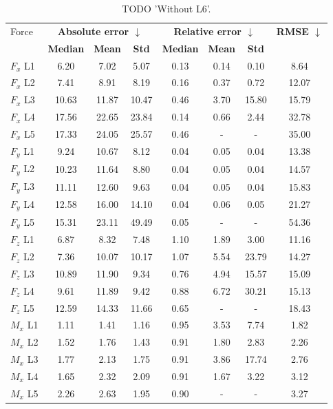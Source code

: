 \begin{table}[h]
\centering
\caption{TODO 'Without L6'.}
\label{tab:prelim:without_l6.tex}
\begin{tabular}{lccccccc}
\toprule
Force & \multicolumn{3}{c}{\bfseries Absolute error $\downarrow$} & \multicolumn{3}{c}{\bfseries Relative error $\downarrow$} & \bfseries RMSE $\downarrow$ \\
  & \bfseries Median & \bfseries Mean & \bfseries Std & \bfseries Median & \bfseries Mean & \bfseries Std & \bfseries   \\
\midrule
$F_x$ L1 & 6.20 & 7.02 & 5.07 & 0.13 & 0.14 & 0.10 & 8.64 \\
$F_x$ L2 & 7.41 & 8.91 & 8.19 & 0.16 & 0.37 & 0.72 & 12.07 \\
$F_x$ L3 & 10.63 & 11.87 & 10.47 & 0.46 & 3.70 & 15.80 & 15.79 \\
$F_x$ L4 & 17.56 & 22.65 & 23.84 & 0.14 & 0.66 & 2.44 & 32.78 \\
$F_x$ L5 & 17.33 & 24.05 & 25.57 & 0.46 & - & - & 35.00 \\
$F_y$ L1 & 9.24 & 10.67 & 8.12 & 0.04 & 0.05 & 0.04 & 13.38 \\
$F_y$ L2 & 10.23 & 11.64 & 8.80 & 0.04 & 0.05 & 0.04 & 14.57 \\
$F_y$ L3 & 11.11 & 12.60 & 9.63 & 0.04 & 0.05 & 0.04 & 15.83 \\
$F_y$ L4 & 12.58 & 16.00 & 14.10 & 0.04 & 0.06 & 0.05 & 21.27 \\
$F_y$ L5 & 15.31 & 23.11 & 49.49 & 0.05 & - & - & 54.36 \\
$F_z$ L1 & 6.87 & 8.32 & 7.48 & 1.10 & 1.89 & 3.00 & 11.16 \\
$F_z$ L2 & 7.36 & 10.07 & 10.17 & 1.07 & 5.54 & 23.79 & 14.27 \\
$F_z$ L3 & 10.89 & 11.90 & 9.34 & 0.76 & 4.94 & 15.57 & 15.09 \\
$F_z$ L4 & 9.61 & 11.89 & 9.42 & 0.88 & 6.72 & 30.21 & 15.13 \\
$F_z$ L5 & 12.59 & 14.33 & 11.66 & 0.65 & - & - & 18.43 \\
$M_x$ L1 & 1.11 & 1.41 & 1.16 & 0.95 & 3.53 & 7.74 & 1.82 \\
$M_x$ L2 & 1.52 & 1.76 & 1.43 & 0.91 & 1.80 & 2.83 & 2.26 \\
$M_x$ L3 & 1.77 & 2.13 & 1.75 & 0.91 & 3.86 & 17.74 & 2.76 \\
$M_x$ L4 & 1.65 & 2.32 & 2.09 & 0.91 & 1.67 & 3.22 & 3.12 \\
$M_x$ L5 & 2.26 & 2.63 & 1.95 & 0.90 & - & - & 3.27 \\

\end{tabular}
\end{table}
